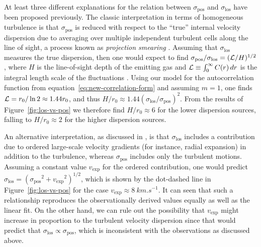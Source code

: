 \documentclass[fleqn,usenatbib, useAMS, a4paper]{mnras}
\newcommand\pos{\ensuremath{_{\mathrm{pos}}}}
\newcommand\los{\ensuremath{_{\mathrm{los}}}}
\begin{document}

At least three different explanations for the relation
between \(\sigma\pos\) and \(\sigma\los\) have been proposed previously.
The classic interpretation in terms of homogeneous turbulence
is that \(\sigma\pos\) is reduced with respect to the ``true''
internal velocity dispersion
due to averaging over multiple independent turbulent cells
along the line of sight,
a process known as \textit{projection smearing}
\citep{von1951methode, 1984ApJ...277..556S}.
Assuming that \(\sigma\los\) measures the true dispersion,
then one would expect to find \(\sigma\pos / \sigma\los = (\LL /H)^{1/2}\),
where \(H\) is the line-of-sight depth of the emitting gas
and \(\mathcal{L} \equiv \int_0^\infty C(r)\, dr\) is the integral length scale of
the fluctuations \citep{Pope:2000p}.
Using our model for the autocorrelation function from
equation~\eqref{eq:new-correlation-form} and assuming \(m = 1\),
one finds \(\mathcal{L} = r_0 / \ln 2 \approx 1.44 r_0\),
and thus \(H / r_0 \approx 1.44 (\sigma\los / \sigma\pos)^2\).
From the results of Figure~\ref{fig:los-vs-pos} we therefore find
\(H / r_0 \approx 6\) for the lower dispersion sources,
falling to \(H / r_0 \approx 2\) for the higher dispersion sources.

\newcommand\vexp{\ensuremath{v_{\text{exp}}}}
An alternative interpretation,
as discussed in \citet{2011MNRAS.413..705L},
is that \(\sigma\los\) includes a contribution due to
ordered large-scale velocity gradients
(for instance, radial expansion)
in addition to the turbulence,
whereas \(\sigma\pos\) includes only the turbulent motions. 
Assuming a constant value \vexp{} for the ordered contribution,
one would predict \(\sigma\los = (\sigma\pos^2 + \vexp^2)^{1/2}\),
which is shown by the dot-dashed line in Figure~\ref{fig:los-vs-pos}
for the case \(\vexp \approx \SI{8}{km.s^{-1}}\).
It can seen that such a relationship reproduces the 
observationally derived values equally as well as the linear fit.
On the other hand, we can rule out the possibility that
\vexp{} might increase in proportion to the turbulent velocity dispersion
since that would predict that \(\sigma\los \propto \sigma\pos\),
which is inconsistent with the observations as discussed above.
\end{document}
